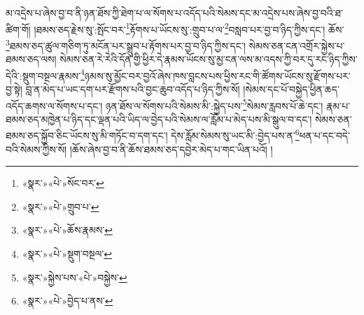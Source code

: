 མ་འདྲེས་པ་ཞེས་བྱ་བ་ནི་ཉན་ཐོས་ཀྱི་ཐེག་པ་ལ་སོགས་པ་འདོད་པའི་སེམས་དང་མ་འདྲེས་པས་ཞེས་བྱ་བའི་ཐ་ཚིག་གོ། །ཐམས་ཅད་རྗེས་སུ་:སྤོང་བར་\footnote{«སྣར་»«པེ་»སོང་བར་}རྟོགས་པ་ཡོངས་སུ་:གྲུབ་པ་ལ་\footnote{«སྣར་»«པེ་»གྲུབ་པ་}བསླབ་པར་བྱ་བ་ཉིད་ཀྱིས་དང་། ཆོས་\footnote{«སྣར་»«པེ་»ཆོས་རྣམས་}ཐམས་ཅད་ཚུལ་གཅིག་ཏུ་མངོན་པར་སྒྲུབ་པ་རྟོགས་པར་བྱ་བ་ཉིད་ཀྱིས་དང་། སེམས་ཅན་ངན་འགྲོར་སྐྱེས་པ་ཐམས་ཅད་ལས། སེམས་ཅན་རེ་རེའི་དོན་གྱི་ཕྱིར་དེ་རྣམས་ཡོངས་སུ་མྱ་ངན་ལས་མ་འདས་ཀྱི་བར་དུ་རང་ཉིད་ཀྱིས་དེའི་:སྡུག་བསྔལ་རྣམས་\footnote{«སྣར་»«པེ་»སྡུག་བསྔལ་}ཉམས་སུ་མྱོང་བར་བྱའོ་ཞེས་ཁས་བླངས་པས་ཕྱིས་རང་གི་ཚོགས་ཡོངས་སུ་རྫོགས་པར་བྱ་སྟེ། བླ་ན་མེད་པ་ཡང་དག་པར་རྫོགས་པའི་བྱང་ཆུབ་འདོད་པ་ཉིད་ཀྱིས་སོ། །སེམས་དང་པོ་བསྐྱེད་ཕྱིན་ཆད་འདོད་ཆགས་ལ་སོགས་པ་དང་། ཉན་ཐོས་ལ་སོགས་པའི་སེམས་མི་:སྐྱེད་པས་\footnote{«སྣར་»སྐྱེས་པས་«པེ་»བསྐྱེས་}སེམས་རླབས་པོ་ཆེ་དང་། རྣམ་པ་ཐམས་ཅད་མཁྱེན་པ་ཉིད་དང་ལྡན་པའི་ཡིད་ལ་བྱེད་པའི་སེམས་ལ་རློམ་པ་མེད་པས་མི་སྒུལ་བ་དང་། སེམས་ཅན་ཐམས་ཅད་སྐྱོབ་ཅིང་ཡོངས་སུ་མི་གཏོང་བ་དག་དང་། དེས་རློམ་སེམས་སུ་ཡང་མི་:བྱེད་པས་ན་\footnote{«སྣར་»«པེ་»བྱེད་པ་ནས་}ཕན་པ་དང་བདེ་བའི་སེམས་ཀྱིས་སོ། །ཆོས་ཞེས་བྱ་བ་ནི་ཆོས་ཐམས་ཅད་དབྱེར་མེད་པ་གང་ཡིན་པའོ། །
